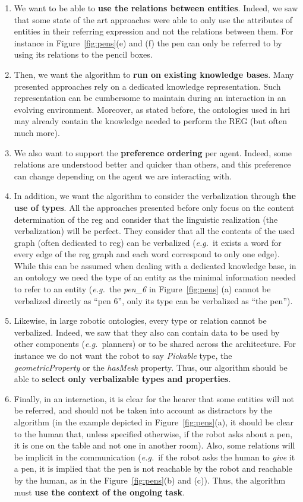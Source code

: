 \documentclass[a4paper,11pt,twoside]{StyleThese}
\begin{document}
\begin{enumerate}


\item We want to be able to \textbf{use the relations between entities}. Indeed, we saw that some state of the art approaches were able to only use the attributes of entities in their referring expression and not the relations between them. For instance in Figure~\ref{fig:pens}(e) and (f) the pen can only be referred to by using its relations to the pencil boxes. 
\item Then, we want the algorithm to \textbf{run on existing knowledge bases}. Many presented approaches rely on a dedicated knowledge representation. Such representation can be cumbersome to maintain during an interaction in an evolving environment. Moreover, as stated before, the ontologies used in \acrshort{hri} may already contain the knowledge needed to perform the REG (but often much more). 
\item We also want to support the \textbf{preference ordering} per agent. Indeed, some relations are understood better and quicker than others, and this preference can change depending on the agent we are interacting with. 
\item In addition, we want the algorithm to consider the verbalization through \textbf{the use of types}. All the approaches presented before only focus on the content determination of the \acrshort{reg} and consider that the linguistic realization (the verbalization) will be perfect. They consider that all the contents of the used graph (often dedicated to \acrshort{reg}) can be verbalized (\textit{e.g.}~it exists a word for every edge of the \acrshort{reg} graph and each word correspond to only one edge). While this can be assumed when dealing with a dedicated knowledge base, in an ontology we need the type of an entity as the minimal information needed to refer to an entity (\textit{e.g.}~the \textit{pen\_6} in Figure~\ref{fig:pens} (a) cannot be verbalized directly as ``pen 6'', only its type can be verbalized as ``the pen'').
\item Likewise, in large robotic ontologies, every type or relation cannot be verbalized. Indeed, we saw that they also can contain data to be used by other components (\textit{e.g.}~planners) or to be shared across the architecture. For instance we do not want the robot to say \textit{Pickable} type, the \textit{geometricProperty} or the \textit{hasMesh} property. Thus, our algorithm should be able to \textbf{select only verbalizable types and properties}.
\item Finally, in an interaction, it is clear for the hearer that some entities will not be referred, and should not be taken into account as distractors by the algorithm (in the example depicted in Figure~\ref{fig:pens}(a), it should be clear to the human that, unless specified otherwise, if the robot asks about a pen, it is one on the table and not one in another room). Also, some relations will be implicit in the communication (\textit{e.g.}~if the robot asks the human to \textit{give} it a pen, it is implied that the pen is not reachable by the robot and reachable by the human, as in the Figure~\ref{fig:pens}(b) and (c)). Thus, the algorithm must \textbf{use the context of the ongoing task}. 

\end{enumerate}
\end{document}
